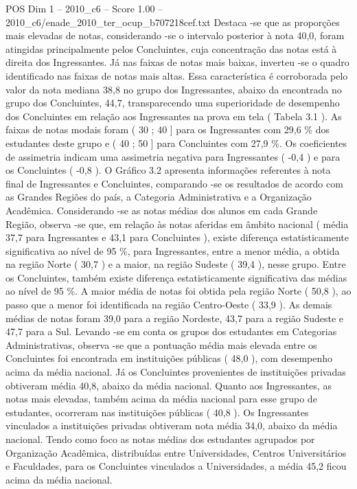 \begin{textsample}{POS Dim 1 – 2010\_c6 – Score 1.00 – 2010\_c6/enade\_2010\_ter\_ocup\_b707218cef.txt}
Destaca -se que as proporções mais elevadas de notas, considerando -se o intervalo posterior à nota 40,0, foram atingidas principalmente pelos Concluintes, cuja concentração das notas está à direita dos Ingressantes.
Já nas faixas de notas mais baixas, inverteu -se o quadro identificado nas faixas de notas mais altas.
Essa característica é corroborada pelo valor da nota mediana 38,8 no grupo dos Ingressantes, abaixo da encontrada no grupo dos Concluintes, 44,7, transparecendo uma superioridade de desempenho dos Concluintes em relação aos Ingressantes na prova em tela ( Tabela 3.1 ).
As faixas de notas modais foram ( 30 ; 40 ] para os Ingressantes com 29,6 \% dos estudantes deste grupo e ( 40 ; 50 ] para Concluintes com 27,9 \%.
Os coeficientes de assimetria indicam uma assimetria negativa para Ingressantes ( -0,4 ) e para os Concluintes ( -0,8 ).
O Gráfico 3.2 apresenta informações referentes à nota final de Ingressantes e Concluintes, comparando -se os resultados de acordo com as Grandes Regiões do país, a Categoria Administrativa e a Organização Acadêmica.
Considerando -se as notas médias dos alunos em cada Grande Região, observa -se que, em relação às notas aferidas em âmbito nacional ( média 37,7 para Ingressantes e 43,1 para Concluintes ), existe diferença estatisticamente significativa ao nível de 95 \%, para Ingressantes, entre a menor média, a obtida na região Norte ( 30,7 ) e a maior, na região Sudeste ( 39,4 ), nesse grupo.
Entre os Concluintes, também existe diferença estatisticamente significativa das médias ao nível de 95 \%.
A maior média de notas foi obtida pela região Norte ( 50,8 ), ao passo que a menor foi identificada na região Centro-Oeste ( 33,9 ).
As demais médias de notas foram 39,0 para a região Nordeste, 43,7 para a região Sudeste e 47,7 para a Sul.
Levando -se em conta os grupos dos estudantes em Categorias Administrativas, observa -se que a pontuação média mais elevada entre os Concluintes foi encontrada em instituições públicas ( 48,0 ), com desempenho acima da média nacional.
Já os Concluintes provenientes de instituições privadas obtiveram média 40,8, abaixo da média nacional.
Quanto aos Ingressantes, as notas mais elevadas, também acima da média nacional para esse grupo de estudantes, ocorreram nas instituições públicas ( 40,8 ).
Os Ingressantes vinculados a instituições privadas obtiveram nota média 34,0, abaixo da média nacional.
Tendo como foco as notas médias dos estudantes agrupados por Organização Acadêmica, distribuídas entre Universidades, Centros Universitários e Faculdades, para os Concluintes vinculados a Universidades, a média 45,2 ficou acima da média nacional.

\end{textsample}
